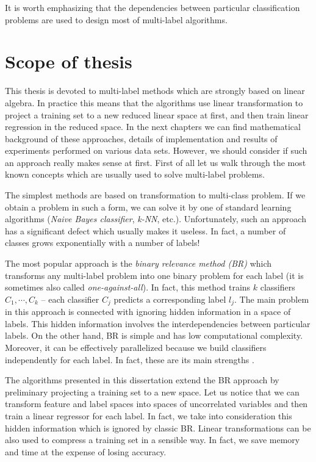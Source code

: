 \documentclass[english,a4paper,twoside]{ppfcmthesis}
\begin{document}
It is worth emphasizing that the dependencies between particular classification problems are used to design most of multi-label algorithms. 

\section{Scope of thesis}

This thesis is devoted to multi-label methods which are strongly based on linear algebra. In practice this means that the algorithms use linear transformation to project a training set to a new reduced linear space at first, and then train linear regression in the reduced space. In the next chapters we can find mathematical background of these approaches, details of implementation and results of experiments performed on various data sets. However, we should consider if such an approach really makes sense at first. First of all let us walk through the most known concepts which are usually used to solve multi-label problems.

The simplest methods are based on transformation to multi-class problem. If we obtain a problem in such a form, we can solve it by one of standard learning algorithms (\textit{Naive Bayes classifier}, \textit{k-NN}, etc.). Unfortunately, such an approach has a significant defect which usually makes it useless. In fact, a number of classes grows exponentially with a number of labels!

The most popular approach is the \textit{binary relevance method (BR)} which transforms any multi-label problem into one binary problem for each label (it is sometimes also called \textit{one-against-all}). In fact, this method trains $k$ classifiers $C_1, \cdots, C_{k}$ -- each classifier $C_j$ predicts a corresponding label $l_j$.  The main problem in this approach is connected with ignoring hidden information in a space of labels. This hidden information involves the interdependencies between particular labels. On the other hand, BR is simple and has low computational complexity. Moreover, it can be effectively parallelized because we build classifiers independently for each label. In fact, these are its main strengths \citep{Chain}.

The algorithms presented in this dissertation extend the BR approach by preliminary projecting a training set to a new space. Let us notice that we can transform feature and label spaces into spaces of uncorrelated variables and then train a linear regressor for each label. In fact, we take into consideration this hidden information which is ignored by classic BR. Linear transformations can be also used to compress a training set in a sensible way. In fact, we save memory and time at the expense of losing accuracy. 
\end{document}
